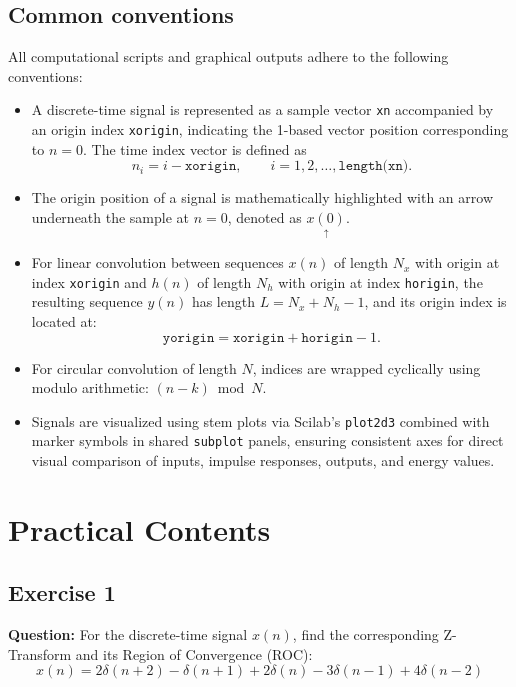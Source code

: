 \documentclass[12pt,a4paper]{article}
\newcommand{\org}[1]{\underset{\uparrow}{#1}}
\begin{document}
\subsection{Common conventions}
All computational scripts and graphical outputs adhere to the following conventions:
\begin{itemize}
    \item A discrete-time signal is represented as a sample vector \texttt{xn} accompanied by an origin index \texttt{xorigin}, indicating the 1-based vector position corresponding to $n = 0$. The time index vector is defined as
    \begin{equation}
        n_i = i - \texttt{xorigin}, \qquad i = 1, 2, \dots, \texttt{length(xn)}.
        \label{eq:index}
    \end{equation}
    \item The origin position of a signal is mathematically highlighted with an arrow underneath the sample at $n = 0$, denoted as $\org{x(0)}$.
    \item For linear convolution between sequences $x(n)$ of length $N_x$ with origin at index \texttt{xorigin} and $h(n)$ of length $N_h$ with origin at index \texttt{horigin}, the resulting sequence $y(n)$ has length $L = N_x + N_h - 1$, and its origin index is located at:
    \begin{equation}
        \texttt{yorigin} = \texttt{xorigin} + \texttt{horigin} - 1.
    \end{equation}
    \item For circular convolution of length $N$, indices are wrapped cyclically using modulo arithmetic: $(n - k) \bmod N$.
    \item Signals are visualized using stem plots via Scilab's \texttt{plot2d3} combined with marker symbols in shared \texttt{subplot} panels, ensuring consistent axes for direct visual comparison of inputs, impulse responses, outputs, and energy values.
\end{itemize}


\section{Practical Contents}

\subsection{Exercise 1} \label{sec:ex1}
\noindent\textbf{Question:}
For the discrete-time signal $x(n)$, find the corresponding Z-Transform and its Region of Convergence (ROC):
\[
x(n) = 2\delta(n + 2) - \delta(n + 1) + 2\delta(n) - 3\delta(n - 1) + 4\delta(n - 2)
\]
\end{document}
